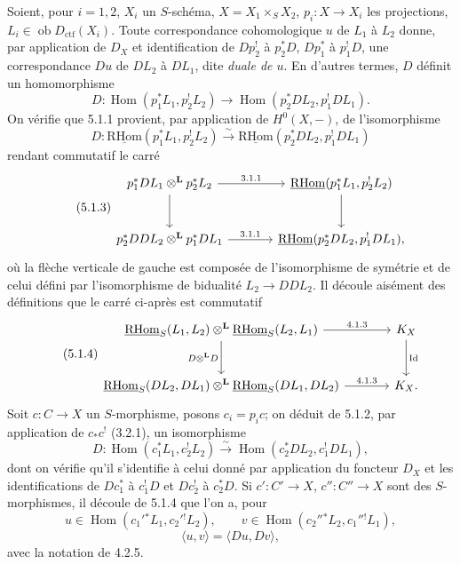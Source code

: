 \documentclass[11pt]{article}
\DeclareMathOperator{\Hom}{Hom}
\newcommand{\R}{\mathrm{R}}\newcommand{\RHomCore}{\mathrm{RHom}}
\providecommand{\RHom}{\RHomCore}
\providecommand{\uRHom}{\underline{\RHom}}
\providecommand{\RHom}{\RHomCore}
\providecommand{\Hom}{\operatorname{Hom}}
\providecommand{\RHom}{\R\mathcal{H}om}
\providecommand{\R}{\mathrm R}
\providecommand{\RHom}{\RHomCore}
\providecommand{\Hom}{\operatorname{Hom}}
\begin{document}
Soient, pour $i=1,2$, $X_i$ un $S$-schéma, $X=X_1\times_S X_2$, $p_i:X\to X_i$ les projections, $L_i\in\operatorname{ob}D_{\mathrm{ctf}}(X_i)$. Toute correspondance cohomologique $u$ de $L_1$ à $L_2$ donne, par application de $D_X$ et identification de $Dp_2^!$ à $p_2^*D$, $Dp_1^*$ à $p_1^!D$, une correspondance $Du$ de $DL_2$ à $DL_1$, dite \emph{duale de $u$}. En d'autres termes, $D$ définit un homomorphisme
\begin{equation}
\tag{5.1.1}
D:\Hom(p_1^*L_1,p_2^!L_2)\longrightarrow \Hom(p_2^*DL_2,p_1^!DL_1).
\end{equation}
On vérifie que 5.1.1 provient, par application de $H^0(X,-)$, de l'isomorphisme
\begin{equation}
\tag{5.1.2}
D:\uRHom(p_1^*L_1,p_2^!L_2)\xrightarrow{\sim}\uRHom(p_2^*DL_2,p_1^!DL_1)
\end{equation}
rendant commutatif le carré
\begin{equation}
\tag{5.1.3}
\begin{tikzcd}[column sep=large,row sep=large]
p_1^*DL_1\otimes^{\mathbf L}p_2^*L_2 \arrow[r,"3.1.1"] \arrow[d]
& \uRHom(p_1^*L_1,p_2^!L_2) \arrow[d] \\
p_2^*DDL_2\otimes^{\mathbf L}p_1^*DL_1 \arrow[r,"3.1.1"]
& \uRHom(p_2^*DL_2,p_1^!DL_1),
\end{tikzcd}
\end{equation}
où la flèche verticale de gauche est composée de l'isomorphisme de symétrie et de celui défini par l'isomorphisme de bidualité $L_2\to DDL_2$. Il découle aisément des définitions que le carré ci-après est commutatif
\begin{equation}
\tag{5.1.4}
\begin{tikzcd}[column sep=large,row sep=large]
\uRHom_S(L_1,L_2)\otimes^{\mathbf L}\uRHom_S(L_2,L_1) \arrow[r,"4.1.3"] \arrow[d,"D\otimes^{\mathbf L} D"']
& K_X \arrow[d,"\operatorname{Id}"] \\
\uRHom_S(DL_2,DL_1)\otimes^{\mathbf L}\uRHom_S(DL_1,DL_2) \arrow[r,"4.1.3"]
& K_X.
\end{tikzcd}
\end{equation}
Soit $c:C\to X$ un $S$-morphisme, posons $c_i=p_ic$; on déduit de 5.1.2, par application de $c_*c^!$ (3.2.1), un isomorphisme
\begin{equation}
\tag{5.1.5}
D:\Hom(c_1^*L_1,c_2^!L_2)\xrightarrow{\sim}\Hom(c_2^*DL_2,c_1^!DL_1),
\end{equation}
dont on vérifie qu'il s'identifie à celui donné par application du foncteur $D_X$ et les identifications de $Dc_1^*$ à $c_1^!D$ et $Dc_2^!$ à $c_2^*D$. Si $c':C'\to X$, $c'':C''\to X$ sont des $S$-morphismes, il découle de 5.1.4 que l'on a, pour
\[
u\in\Hom(c_1'{}^*L_1,c_2'{}^!L_2),\qquad v\in\Hom(c_2''{}^*L_2,c_1''{}^!L_1),\]
\begin{equation}
\tag{5.1.6}
\langle u,v\rangle=\langle Du,Dv\rangle,
\end{equation}
avec la notation de 4.2.5.
\end{document}
